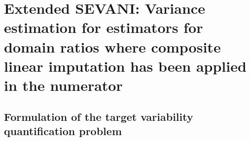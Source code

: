 

\section{Extended SEVANI: Variance estimation for estimators for {\color{red}domain ratios} where composite linear imputation has been applied in the {\color{red}numerator}}
\label{DomainRatioSEVANI}


\subsection{Formulation of the target variability quantification problem}
\label{DomainRatioFormulationOfVarianceEstimationProblem}
\setcounter{theorem}{0}


